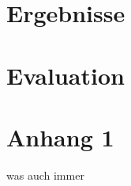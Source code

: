 \documentclass[a4paper,ngerman,naustrian,DIV=12,BCOR=1cm]{scrbook}
\begin{document}
\Blindtext


\chapter{Ergebnisse}

\renewcommand{\kapitelautor}{Autor: Susi Sorglos}

\blindmathpaper\Blindtext


\chapter{Evaluation}

\renewcommand{\kapitelautor}{Autor: Blindtext}

\Blindtext

\Blinddocument\Blindtext\Blinddocument[2]\Blindtext\Blinddocument[5]\Blindtext\Blinddocument[10]\Blindtext\Blindtext

\renewcommand{\kapitelautor}{}

\appendix

\chapter{Anhang 1\label{chap:Anhang-1}}

was auch immer

\printindex{}



\end{document}
